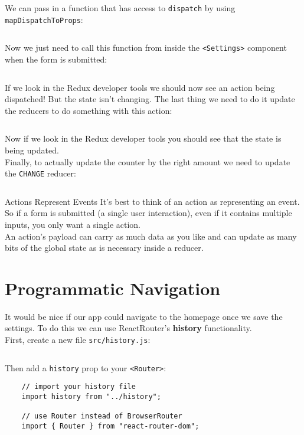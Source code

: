 We can pass in a function that has access to \texttt{dispatch} by using \texttt{mapDispatchToProps}:

\inputminted{js}{03/figures/07-Settings.js}

Now we just need to call this function from inside the \texttt{<Settings>} component when the form is submitted:

\inputminted{js}{03/figures/08-Settings.jsx}

If we look in the Redux developer tools we should now see an action being dispatched! But the state isn't changing. The last thing we need to do it update the reducers to do something with this action:

\inputminted{js}{03/figures/09-reducers.js}

Now if we look in the Redux developer tools you should see that the state is being updated.
\\

Finally, to actually update the counter by the right amount we need to update the \texttt{CHANGE} reducer:

\inputminted{js}{03/figures/10-change.js}


\begin{infobox}{Actions Represent Events}
    It's best to think of an action as representing an event. So if a form is submitted (a single user interaction), even if it contains multiple inputs, you only want a single action.
    \\

    An action's payload can carry as much data as you like and can update as many bits of the global state as is necessary inside a reducer.
\end{infobox}



\section{Programmatic Navigation}

It would be nice if our app could navigate to the homepage once we save the settings. To do this we can use ReactRouter's \textbf{history} functionality.
\\

First, create a new file \texttt{src/history.js}:

\inputminted{js}{03/figures/11-history.js}

Then add a \texttt{history} prop to your \texttt{<Router>}:

\begin{verbatim}
    // import your history file
    import history from "../history";

    // use Router instead of BrowserRouter
    import { Router } from "react-router-dom";
\end{verbatim}

